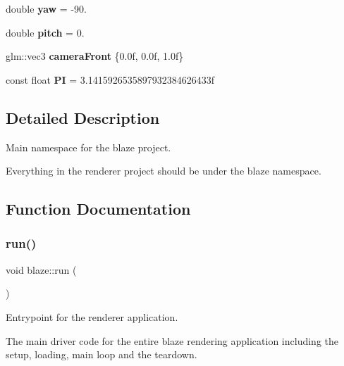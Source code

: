 \begin{DoxyCompactItemize}
\mbox{\label{namespaceblaze_a5b1ce832a690b1e89182e40b7a9eee35}} 
double {\bfseries yaw} = -\/90.
\item 
\mbox{\label{namespaceblaze_a75df1b83daa23dfc1ddb46edbfcf986f}} 
double {\bfseries pitch} = 0.
\item 
\mbox{\label{namespaceblaze_a1855dc6e19f2784ca0ab2cc800c11a7c}} 
glm\+::vec3 {\bfseries camera\+Front} \{0.\+0f, 0.\+0f, 1.\+0f\}
\item 
\mbox{\label{namespaceblaze_a4bf14e5df3c7f5f38ca064481b1f3dbe}} 
const float {\bfseries PI} = 3.\+1415926535897932384626433f
\end{DoxyCompactItemize}


\subsection{Detailed Description}
Main namespace for the blaze project. 

Everything in the renderer project should be under the blaze namespace. 

\subsection{Function Documentation}
\mbox{\label{namespaceblaze_a30b4c7084364b8340000c327f37f794b}} 
\subsubsection{\texorpdfstring{run()}{run()}}
{\footnotesize\ttfamily void blaze\+::run (\begin{DoxyParamCaption}{ }\end{DoxyParamCaption})}



Entrypoint for the renderer application. 

The main driver code for the entire blaze rendering application including the setup, loading, main loop and the teardown. 